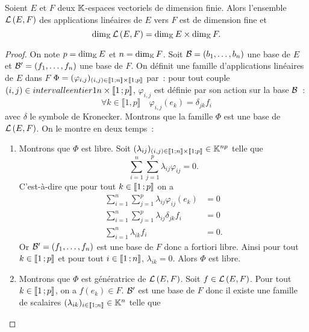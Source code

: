 \begin{theo}
  Soient \(E\) et \(F\) deux \(\mathbb{K}\)-espaces vectoriels de dimension finie. Alors l'ensemble \(\mathcal{L}\left(E,F\right)\) des applications linéaires de \(E\) vers \(F\) est de dimension fine et
  \begin{equation}
    \operatorname{dim}_{\mathbb{K}} \mathcal{L}\left(E,F\right) = \operatorname{dim}_{\mathbb{K}} E \times \operatorname{dim}_{\mathbb{K}} F.
  \end{equation}
\end{theo}
\begin{proof}
  On note \(p=\operatorname{dim}_{\mathbb{K}} E\) et \(n=\operatorname{dim}_{\mathbb{K}} F\). Soit \(\mathcal{B}=(b_1, \ldots, b_n)\) une base de \(E\) et \(\mathcal{B}'=(f_1, \ldots, f_n)\) une base de \(F\). On définit une famille d'applications linéaires de \(E\) dans \(F\) \(\Phi = (\varphi_{i,j})_{(i,j) \in \mathopen{\llbracket}1\mathclose{}\mathpunct{};n\mathclose{\rrbracket} \times \mathopen{\llbracket}1\mathclose{}\mathpunct{};p\mathclose{\rrbracket}}\) par~: pour tout couple \((i,j) \in intervalleentier{1}{n} \times \mathopen{\llbracket}1\mathclose{}\mathpunct{};p\mathclose{\rrbracket}\), \(\varphi_{i,j}\) est définie par son action sur la base \(\mathcal{B}\)~:
  \begin{equation}
    \forall k \in \llbracket 1,p \rrbracket \quad \varphi_{i,j}(e_k)= \delta_{jk} f_i
  \end{equation}
  avec \(\delta\) le symbole de Kronecker. Montrons que la famille \(\Phi\) est une base de \(\mathcal{L}\left(E,F\right)\). On le montre en deux temps~:
  \begin{enumerate}
  \item Montrons que \(\Phi\) est libre. Soit \((\lambda_{ij})_{(i,j) \in \mathopen{\llbracket}1\mathclose{}\mathpunct{};n\mathclose{\rrbracket} \times \mathopen{\llbracket}1\mathclose{}\mathpunct{};p\mathclose{\rrbracket}} \in \mathbb{K}^{np}\) telle que
    \begin{equation}
      \sum_{i=1}^n \sum_{j=1}^p \lambda_{ij} \varphi_{ij} =0.
    \end{equation}
    C'est-à-dire que pour tout \(k \in \mathopen{\llbracket}1\mathclose{}\mathpunct{};p\mathclose{\rrbracket}\) on a
    \begin{align}
      \sum_{i=1}^n \sum_{j=1}^p \lambda_{ij} \varphi_{ij}(e_k) &=0\\
      \sum_{i=1}^n \sum_{j=1}^p \lambda_{ij} \delta_{jk} f_i &=0\\
      \sum_{i=1}^n \lambda_{ik} f_i &=0.
    \end{align}
    Or \(\mathcal{B}'=(f_1, \ldots, f_n)\) est une base de \(F\) donc a fortiori libre. Ainsi pour tout \(k \in \mathopen{\llbracket}1\mathclose{}\mathpunct{};p\mathclose{\rrbracket}\) et pour tout \(i \in \mathopen{\llbracket}1\mathclose{}\mathpunct{};n\mathclose{\rrbracket}\), \(\lambda_{ik}=0\). Alors \(\Phi\) est libre.
  \item  Montrons que \(\Phi\) est génératrice de \(\mathcal{L}\left(E,F\right)\). Soit \(f \in \mathcal{L}\left(E,F\right)\). Pour tout \(k \in \mathopen{\llbracket}1\mathclose{}\mathpunct{};p\mathclose{\rrbracket}\), on a \(f(e_k) \in F\). \(\mathcal{B}'\) est une base de \(F\) donc il existe une famille de scalaires \((\lambda_{ik})_{i \in  \mathopen{\llbracket}1\mathclose{}\mathpunct{};n\mathclose{\rrbracket}} \in \mathbb{K}^n\) telle que

\end{enumerate}
\end{proof}
